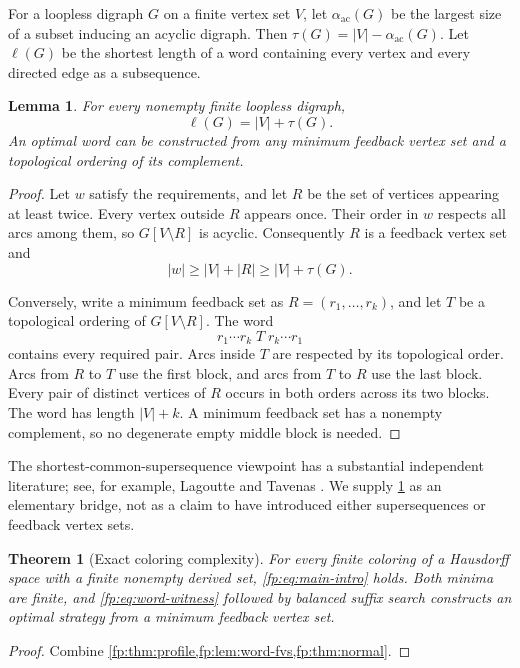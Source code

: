 \documentclass[11pt,letterpaper]{article}
\numberwithin{equation}{section}
\newtheorem{theorem}{Theorem}[section]
\newtheorem{lemma}[lemma]{Lemma}
\theoremstyle{definition}
\theoremstyle{remark}
\theoremstyle{definition}
\newcommand{\ac}{\alpha_{\mathrm{ac}}}
\begin{document}
For a loopless digraph \(G\) on a finite vertex set \(V\), let
\(\ac(G)\) be the largest size of a subset inducing an acyclic digraph.
Then \(\tau(G)=|V|-\ac(G)\). Let \(\ell(G)\) be the shortest length
of a word containing every vertex and every directed edge as a
subsequence.

\begin{lemma}\label{fp:lem:word-fvs}
For every nonempty finite loopless digraph,
\[
 \ell(G)=|V|+\tau(G).
\]
An optimal word can be constructed from any minimum feedback vertex set
and a topological ordering of its complement.
\end{lemma}
\begin{proof}
Let \(w\) satisfy the requirements, and let \(R\) be the set of vertices
appearing at least twice. Every vertex outside \(R\) appears once. Their
order in \(w\) respects all arcs among them, so \(G[V\setminus R]\)
is acyclic. Consequently \(R\) is a feedback vertex set and
\[
 |w|\geq |V|+|R|\geq |V|+\tau(G).
\]

Conversely, write a minimum feedback set as \(R=(r_1,\ldots,r_k)\),
and let \(T\) be a topological ordering of \(G[V\setminus R]\).
The word
\begin{equation}\label{fp:eq:word-witness}
 r_1\cdots r_k\;T\;r_k\cdots r_1
\end{equation}
contains every required pair. Arcs inside \(T\) are respected by its
topological order. Arcs from \(R\) to \(T\) use the first block,
and arcs from \(T\) to \(R\) use the last block. Every pair of distinct
vertices of \(R\) occurs in both orders across its two blocks.
The word has length \(|V|+k\). A minimum feedback set has a nonempty
complement, so no degenerate empty middle block is needed.
\end{proof}

The shortest-common-supersequence viewpoint has a substantial independent
literature; see, for example, Lagoutte and Tavenas \cite{LT}. We supply
\cref{fp:lem:word-fvs} as an elementary bridge, not as a claim to have
introduced either supersequences or feedback vertex sets.

\begin{theorem}[Exact coloring complexity]\label{fp:thm:fixed}
For every finite coloring of a Hausdorff space with a finite nonempty
derived set, \cref{fp:eq:main-intro} holds. Both minima are finite, and
\cref{fp:eq:word-witness} followed by balanced suffix search constructs an
optimal strategy from a minimum feedback vertex set.
\end{theorem}
\begin{proof}
Combine \cref{fp:thm:profile,fp:lem:word-fvs,fp:thm:normal}.
\end{proof}
\end{document}
